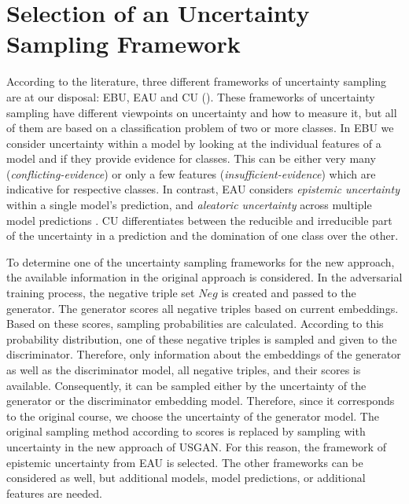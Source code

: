 \section{Selection of an Uncertainty Sampling Framework} 
\label{sec:selection_of_an_uncertainty_sampling_type}
%
According to the literature, three different frameworks of uncertainty sampling are at our disposal:
\ac{EBU}, \ac{EAU} and \ac{CU} ().
These frameworks of uncertainty sampling have different viewpoints on uncertainty and how to measure it, but all of them are based on a classification problem of two or more classes.
In \ac{EBU} we consider uncertainty within a model by looking at the individual features of a model and if they provide evidence for classes.
This can be either very many (\textit{conflicting-evidence}) or only a few features (\textit{insufficient-evidence}) which are indicative for respective classes.
In contrast, \ac{EAU} considers \textit{epistemic uncertainty} within a single model’s prediction, and \textit{aleatoric uncertainty} across multiple model predictions \cite{human-in-the-loop}.
\Ac{CU} differentiates between the reducible and irreducible part of the uncertainty in a prediction and the domination of one class over the other.

To determine one of the uncertainty sampling frameworks for the new approach, the available information in the original \kbgan approach is considered.
In the adversarial training process, the negative triple set $Neg$ is created and passed to the generator.
The generator scores all negative triples based on current embeddings.
Based on these scores, sampling probabilities are calculated.
According to this probability distribution, one of these negative triples is sampled and given to the discriminator.
Therefore, only information about the embeddings of the generator as well as the discriminator model, all negative triples, and their scores is available.
Consequently, it can be sampled either by the uncertainty of the generator or the discriminator embedding model.
Therefore, since it corresponds to the original course, we choose the uncertainty of the generator model.
The original sampling method according to scores is replaced by sampling with uncertainty in the new approach of \textsc{USGAN}.
For this reason, the framework of epistemic uncertainty from \ac{EAU} is selected.
The other frameworks can be considered as well, but additional models, model predictions, or additional features are needed.
%
%
%
